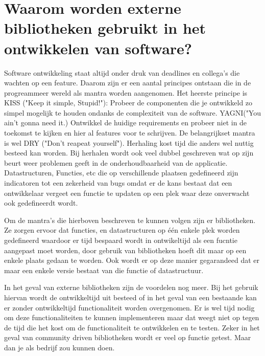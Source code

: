 \section{Waarom worden externe bibliotheken gebruikt in het ontwikkelen van software?}\label{sec:waarom-worden-externe-bibliotheken-gebruikt-in-het-ontwikkelen-van-software?}
Software ontwikkeling staat altijd onder druk van deadlines en collega's die wachten op een feature. Daarom zijn er een aantal principes ontstaan die in de progreammeer wereld als mantra worden aangenomen. Het heerste principe is KISS ("Keep it simple, Stupid!"): Probeer de componenten die je ontwikkeld zo simpel mogelijk te houden ondanks de complexiteit van de software. YAGNI("You ain't gonna need it.) Ontwikkel de huidige requirements en probeer niet in de toekomst te kijken en hier al features voor te schrijven. De belangrijkset mantra is wel DRY ("Don't reapeat yourself"). Herhaling kost tijd die anders wel nuttig besteed kan worden. Bij herhalen wordt ook veel dubbel geschreven wat op zijn beurt weer problemen geeft in de onderhoudbaarheid van de applicatie. Datastructuren, Functies, etc die op verschillende plaatsen gedefineerd zijn indicatoren tot een zekerheid van bugs omdat er de kans bestaat dat een ontwikkelaar vergeet een functie te updaten op een plek waar deze onverwacht ook gedefineerdt wordt. \citep{uselibs}

Om de mantra's die hierboven beschreven te kunnen volgen zijn er bibliotheken. Ze zorgen ervoor dat functies, en datastructuren op één enkele plek worden gedefineerd waardoor er tijd bespaard wordt in ontwikeltijd als een fucntie aangepast moet worden, door gebruik van bibliotheken hoeft dit maar op een enkele plaats gedaan te worden. Ook wordt er op deze manier gegarandeed dat er maar een enkele versie bestaat van die functie of datastructuur.

In het geval van externe bibliotheken zijn de voordelen nog meer. Bij het gebruik hiervan wordt de ontwikkeltijd uit besteed of in het geval van een bestaande kan er zonder ontwikkeltijd functionaliteit worden overgenomen. Er is wel tijd nodig om deze functionaliteiten te kunnen implementeren maar dat weegt niet op tegen de tijd die het kost om de functionaliteit te ontwikkelen en te testen. Zeker in het geval van community driven bibliotheken wordt er veel op functie getest. Maar dan je als bedrijf zou kunnen doen.




